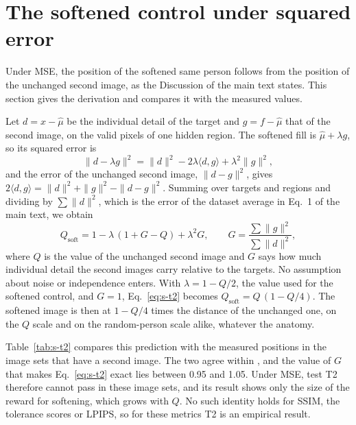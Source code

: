 \section{The softened control under squared error}
\label{sec:s-t2}

Under \ac{MSE}, the position of the softened same person follows from the position of the unchanged second image, as the Discussion of the main text states.
This section gives the derivation and compares it with the measured values.

Let $d=x-\hat\mu$ be the individual detail of the target and $g=f-\hat\mu$ that of the second image, on the valid pixels of one hidden region.
The softened fill is $\hat\mu+\lambda g$, so its squared error is
\begin{equation}
\|d-\lambda g\|^2=\|d\|^2-2\lambda\langle d,g\rangle+\lambda^2\|g\|^2 ,
\end{equation}
and the error of the unchanged second image, $\|d-g\|^2$, gives $2\langle d,g\rangle=\|d\|^2+\|g\|^2-\|d-g\|^2$.
Summing over targets and regions and dividing by $\sum\|d\|^2$, which is the error of the dataset average in Eq.~1 of the main text, we obtain
\begin{equation}
Q_{\mathrm{soft}}=1-\lambda\,(1+G-Q)+\lambda^2 G,\qquad G=\frac{\sum\|g\|^2}{\sum\|d\|^2},
\label{eq:s-t2}
\end{equation}
where $Q$ is the value of the unchanged second image and $G$ says how much individual detail the second images carry relative to the targets.
No assumption about noise or independence enters.
With $\lambda=1-Q/2$, the value used for the softened control, and $G=1$, Eq.~\ref{eq:s-t2} becomes $Q_{\mathrm{soft}}=Q\,(1-Q/4)$.
The softened image is then at $1-Q/4$ times the distance of the unchanged one, on the $Q$ scale and on the random-person scale alike, whatever the anatomy.

Table~\ref{tab:s-t2} compares this prediction with the measured positions in the \tTwoSets{} image sets that have a second image.
The two agree within \tTwoMaxDiff{}, and the value of $G$ that makes Eq.~\ref{eq:s-t2} exact lies between 0.95 and 1.05.
Under \ac{MSE}, test T2 therefore cannot pass in these image sets, and its result shows only the size of the reward for softening, which grows with $Q$.
No such identity holds for \ac{SSIM}, the tolerance scores or \ac{LPIPS}, so for these metrics T2 is an empirical result.

